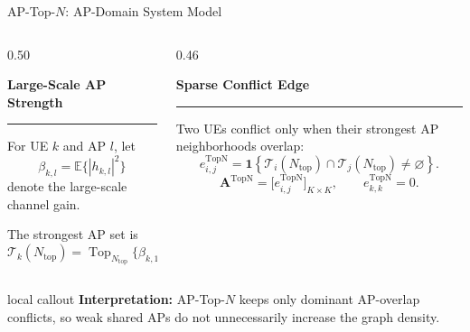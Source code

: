 \documentclass[aspectratio=169, 10pt]{beamer}
\newcommand{\methodTopN}{AP-Top-\(N\)}
\newcommand{\slideheading}[1]{%
    \par\vspace{0.08cm}%
    \settowidth{\dimen0}{\bfseries\large #1}%
    {\bfseries\large #1}%
    \par\vspace{0.015cm}%
    {\color{black}\rule{\dimen0}{0.7pt}}%
    \par\vspace{0.16cm}%
}
\newcommand{\slidecallout}[2]{%
    \vspace{0.08cm}%
    \begin{beamercolorbox}[wd=\linewidth,sep=0.55ex,leftskip=0.8ex,rightskip=0.8ex,rounded=true]{local callout}
        \small{\color{ku_crimson}\bfseries #1:} #2
    \end{beamercolorbox}%
}
\begin{document}
\begin{frame}{\methodTopN{}: AP-Domain System Model}
    \small
    \begin{columns}[T,onlytextwidth]
        \begin{column}{0.50\textwidth}
            \slideheading{Large-Scale AP Strength}
            For UE \(k\) and AP \(l\), let
            \[
                \beta_{k,l}=\mathbb{E}\{|h_{k,l}|^2\}
            \]
            denote the large-scale channel gain.

            \vspace{0.12cm}
            The strongest AP set is
            \[
                \mathcal{T}_k(N_{\mathrm{top}})
                =
                \operatorname{Top}_{N_{\mathrm{top}}}
                \{\beta_{k,1},\ldots,\beta_{k,L}\}.
            \]
        \end{column}
        \begin{column}{0.46\textwidth}
            \slideheading{Sparse Conflict Edge}
            Two UEs conflict only when their strongest AP neighborhoods overlap:
            \[
                e_{i,j}^{\mathrm{TopN}}
                =
                \mathbf{1}\!\left\{
                \mathcal{T}_i(N_{\mathrm{top}})
                \cap
                \mathcal{T}_j(N_{\mathrm{top}})
                \neq \varnothing
                \right\}.
            \]
            \[
                \mathbf{A}^{\mathrm{TopN}}
                =
                \bigl[e_{i,j}^{\mathrm{TopN}}\bigr]_{K\times K},
                \qquad
                e_{k,k}^{\mathrm{TopN}}=0.
            \]
        \end{column}
    \end{columns}

    \slidecallout{Interpretation}{AP-Top-\(N\) keeps only dominant AP-overlap conflicts, so weak shared APs do not unnecessarily increase the graph density.}
\end{frame}
\end{document}
